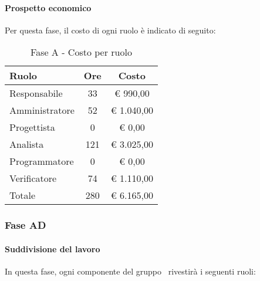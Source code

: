 \documentclass[../PianoProgetto.tex]{subfiles}
\begin{document}
	\paragraph{Prospetto economico}
					Per questa fase, il costo di ogni ruolo è indicato di seguito:
					\begin{table}[h]
		\centering
	
		\begin{tabular}{l * {2}{c}}
			\toprule
			Ruolo & Ore & Costo \\
			\midrule
			Responsabile &	33 & \euro{} 990,00 \\
			\midrule
			Amministratore & 52 & \euro{} 1.040,00 \\
			\midrule
			Progettista & 0 & \euro{} 0,00 \\
			\midrule
			Analista & 121 & \euro{} 3.025,00 \\
			\midrule
			Programmatore & 0 & \euro{} 0,00 \\
			\midrule
			Verificatore & 74 & \euro{} 1.110,00 \\
			\midrule		
			Totale & 280 & \euro{} 6.165,00 \\
			\bottomrule
			
		\end{tabular}
		
		\caption{Fase A - Costo per ruolo}
		\label{tab:faseA_costo}
		
	\end{table}
	\subsubsection{Fase AD}
				\paragraph{Suddivisione del lavoro}
					In questa fase, ogni componente del gruppo \leaf\ rivestirà i seguenti ruoli:
	
\end{document}
